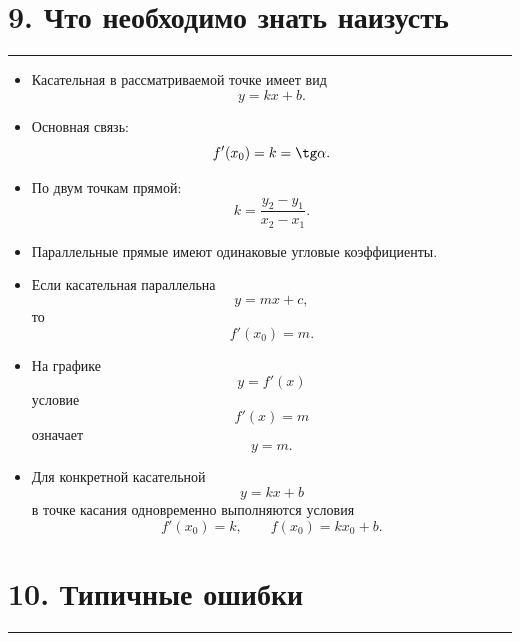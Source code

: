 \documentclass[a4paper,12pt]{article}
\newcommand{\checkbox}{\(\square\)}
\newcommand{\topicrule}{%
  \par\noindent
  {\color{accent}\rule{\linewidth}{0.55pt}}
  \par
}
\begin{document}
\clearpage


\section*{\color{darkaccent}9. Что необходимо знать наизусть}
\topicrule

\begin{itemize}

  \item[\checkbox]
  Касательная в рассматриваемой точке имеет вид
  \[
  y=kx+b.
  \]

  \item[\checkbox]
  Основная связь:
  \[
  f'(x_0)=k=\tg\alpha.
  \]

  \item[\checkbox]
  По двум точкам прямой:
  \[
  k=
  \frac{y_2-y_1}{x_2-x_1}.
  \]

  \item[\checkbox]
  Параллельные прямые имеют одинаковые угловые коэффициенты.

  \item[\checkbox]
  Если касательная параллельна
  \[
  y=mx+c,
  \]
  то
  \[
  f'(x_0)=m.
  \]

  \item[\checkbox]
  На графике
  \[
  y=f'(x)
  \]
  условие
  \[
  f'(x)=m
  \]
  означает
  \[
  y=m.
  \]

  \item[\checkbox]
  Для конкретной касательной
  \[
  y=kx+b
  \]
  в точке касания одновременно выполняются условия
  \[
  f'(x_0)=k,
  \qquad
  f(x_0)=kx_0+b.
  \]

\end{itemize}


\section*{\color{darkaccent}10. Типичные ошибки}
\topicrule
\end{document}
